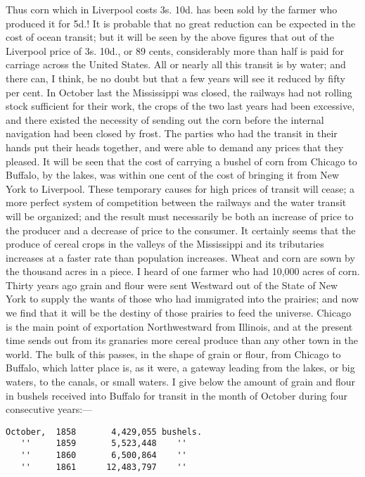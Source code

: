 Thus corn which in Liverpool costs 3s. 10d. has been sold by the
farmer who produced it for 5d.!  It is probable that no great
reduction can be expected in the cost of ocean transit; but it will
be seen by the above figures that out of the Liverpool price of 3s.
10d., or 89 cents, considerably more than half is paid for carriage
across the United States.  All or nearly all this transit is by
water; and there can, I think, be no doubt but that a few years
will see it reduced by fifty per cent.  In October last the
Mississippi was closed, the railways had not rolling stock
sufficient for their work, the crops of the two last years had been
excessive, and there existed the necessity of sending out the corn
before the internal navigation had been closed by frost.  The
parties who had the transit in their hands put their heads
together, and were able to demand any prices that they pleased.  It
will be seen that the cost of carrying a bushel of corn from
Chicago to Buffalo, by the lakes, was within one cent of the cost
of bringing it from New York to Liverpool.  These temporary causes
for high prices of transit will cease; a more perfect system of
competition between the railways and the water transit will be
organized; and the result must necessarily be both an increase of
price to the producer and a decrease of price to the consumer.  It
certainly seems that the produce of cereal crops in the valleys of
the Mississippi and its tributaries increases at a faster rate than
population increases.  Wheat and corn are sown by the thousand
acres in a piece.  I heard of one farmer who had 10,000 acres of
corn.  Thirty years ago grain and flour were sent Westward out of
the State of New York to supply the wants of those who had
immigrated into the prairies; and now we find that it will be the
destiny of those prairies to feed the universe.  Chicago is the
main point of exportation Northwestward from Illinois, and at the
present time sends out from its granaries more cereal produce than
any other town in the world.  The bulk of this passes, in the shape
of grain or flour, from Chicago to Buffalo, which latter place is,
as it were, a gateway leading from the lakes, or big waters, to the
canals, or small waters.  I give below the amount of grain and
flour in bushels received into Buffalo for transit in the month of
October during four consecutive years:---%

{\small
\begin{verbatim}
October,  1858       4,429,055 bushels.
   ''     1859       5,523,448    ''
   ''     1860       6,500,864    ''
   ''     1861      12,483,797    ''
\end{verbatim}}


